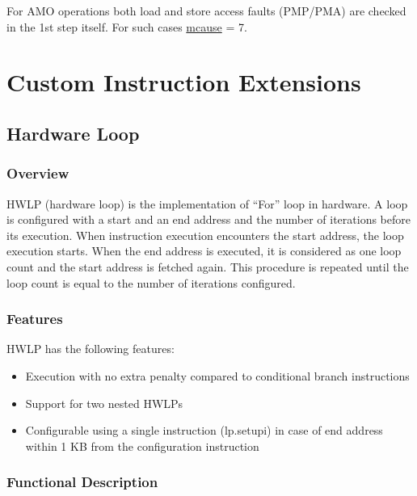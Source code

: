 \documentclass[main\_\_EN.tex]{subfiles}
\begin{document}
For AMO operations both load and store access faults (PMP/PMA) are checked in the 1st step itself. For such cases \hyperref[regdesc:MCAUSE]{mcause} = 7.

\newpage
\section{Custom Instruction Extensions}

\subsection{Hardware Loop}
\label{sec:riscvcpu-hwloop}

\subsubsection{Overview}
\label{sec:riscvcpu-hwloop-overview}

HWLP (hardware loop) is the implementation of “For” loop in hardware. A loop is configured with a start and an end address and the number of iterations before its execution. When instruction execution encounters the start address, the loop execution starts. When the end address is executed, it is considered as one loop count and the start address is fetched again. This procedure is repeated until the loop count is equal to the number of iterations configured.

\subsubsection{Features}
\label{sec:riscvcpu-hwloop-feature}

HWLP has the following features:

\begin{itemize}
\item Execution with no extra penalty compared to conditional branch instructions
\item Support for two nested HWLPs
\item Configurable using a single instruction (lp.setupi) in case of end address within 1 KB from the configuration instruction
\end{itemize}

\subsubsection{Functional Description}
\label{sec:riscvcpu-hwloop-func-descr}
\end{document}
